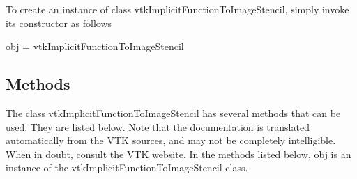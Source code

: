 To create an instance of class vtk\-Implicit\-Function\-To\-Image\-Stencil, simply invoke its constructor as follows \begin{DoxyVerb}  obj = vtkImplicitFunctionToImageStencil
\end{DoxyVerb}
 \hypertarget{vtkwidgets_vtkxyplotwidget_Methods}{}\subsection{Methods}\label{vtkwidgets_vtkxyplotwidget_Methods}
The class vtk\-Implicit\-Function\-To\-Image\-Stencil has several methods that can be used. They are listed below. Note that the documentation is translated automatically from the V\-T\-K sources, and may not be completely intelligible. When in doubt, consult the V\-T\-K website. In the methods listed below, {\ttfamily obj} is an instance of the vtk\-Implicit\-Function\-To\-Image\-Stencil class. 
